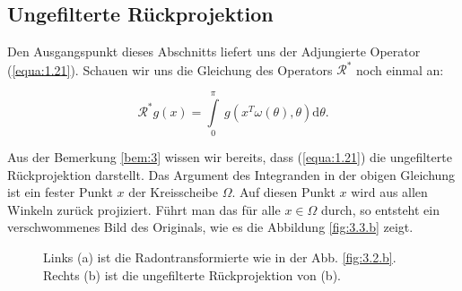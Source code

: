 \subsection*{Ungefilterte Rückprojektion}
\label{cha:3.1.1}

Den Ausgangspunkt dieses Abschnitts liefert uns der Adjungierte Operator (\ref{equa:1.21}). Schauen wir uns die Gleichung des Operators $\mathcal{R}^*$ noch einmal an: 

\[ \mathcal{R^*} g(x) = \int\limits_{0}^{\pi} \ g(x^{T}\omega(\theta),\theta) \mbox{d}\theta. \]  

Aus der Bemerkung \ref{bem:3} wissen wir bereits, dass (\ref{equa:1.21}) die ungefilterte Rückprojektion darstellt. Das Argument des Integranden in der obigen Gleichung ist ein fester Punkt $x$ der Kreisscheibe $\Omega$. Auf diesen Punkt $x$ wird aus allen Winkeln zurück projiziert. Führt man das für alle $x \in \Omega$ durch, so entsteht ein verschwommenes Bild des Originals, wie es die Abbildung \ref{fig:3.3.b} zeigt.
\begin{figure}[!h]
	\begin{center}
	\end{center}
	\caption{ Links (a) ist die Radontransformierte wie in der Abb. \ref{fig:3.2.b}. Rechts (b) ist die ungefilterte Rückprojektion von (b).}
	\label{fig:3.3}
\end{figure}

